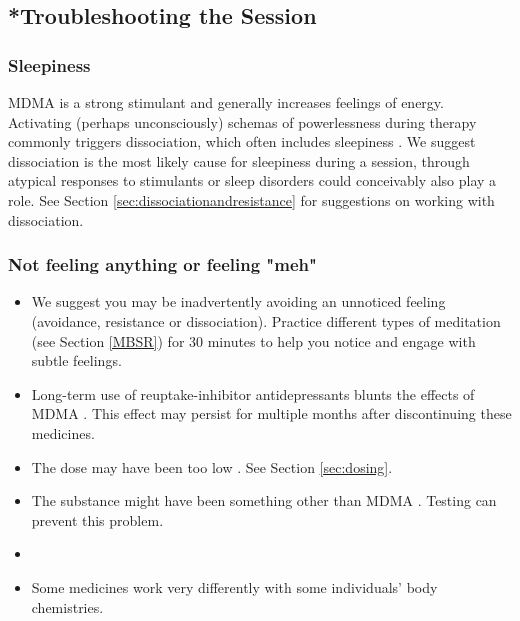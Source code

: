 \documentclass[12pt,letterpaper]{article}
\begin{document}
\subsection{*Troubleshooting the Session}
\subsubsection{Sleepiness}
MDMA is a strong stimulant and generally increases feelings of energy. Activating (perhaps unconsciously) schemas of powerlessness during therapy commonly triggers dissociation, which often includes sleepiness \cite{kozlowskaDefenseCascade}. We suggest dissociation is the most likely cause for sleepiness during a session, through atypical responses to stimulants or sleep disorders could conceivably also play a role. See Section \ref{sec:dissociationandresistance} for suggestions on working with dissociation.
\subsubsection{Not feeling anything or feeling "meh"}
\begin{itemize}
    \item We suggest you may be inadvertently avoiding an unnoticed feeling (avoidance, resistance or dissociation). Practice different types of meditation (see Section \ref{MBSR}) for 30 minutes to help you notice and engage with subtle feelings.
    \item Long-term use of reuptake-inhibitor antidepressants blunts the effects of MDMA \cite{feducciaSSRIDiscontinuation}. This effect may persist for multiple months after discontinuing these medicines.
    \item The dose may have been too low \cite{bediMDMALowDose}. See Section \ref{sec:dosing}.
    \item The substance might have been something other than MDMA \cite{saleemiAdulterants}. Testing can prevent this problem.
    \item {}
    \item Some medicines work very differently with some individuals' body chemistries.
\end{itemize}
\end{document}
